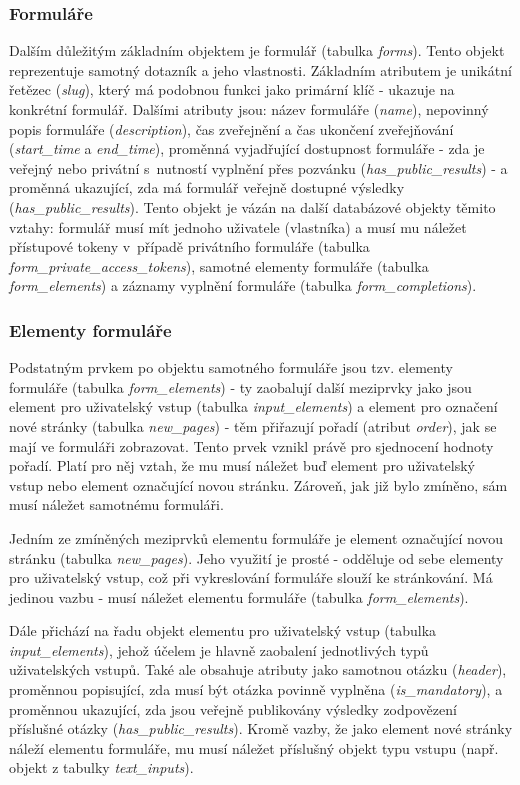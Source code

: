 	\subsubsection{Formuláře}
	Dalším důležitým základním objektem je formulář (tabulka \textit{forms}). Tento objekt reprezentuje samotný dotazník a jeho vlastnosti. Základním atributem je unikátní řetězec (\textit{slug}), který má podobnou funkci jako primární klíč - ukazuje na konkrétní formulář. Dalšími atributy jsou: název formuláře (\textit{name}), nepovinný popis formuláře (\textit{description}), čas zveřejnění a čas ukončení zveřejňování (\textit{start\_time} a \textit{end\_time}), proměnná vyjadřující dostupnost formuláře - zda je veřejný nebo privátní s~nutností vyplnění přes pozvánku (\textit{has\_public\_results}) - a proměnná ukazující, zda má formulář veřejně dostupné výsledky (\textit{has\_public\_results}). Tento objekt je vázán na další databázové objekty těmito vztahy: formulář musí mít jednoho uživatele (vlastníka) a musí mu náležet přístupové tokeny v~případě privátního formuláře (tabulka \textit{form\_private\_access\_tokens}), samotné elementy formuláře (tabulka \textit{form\_elements}) a záznamy vyplnění formuláře (tabulka \textit{form\_completions}).
	
	\subsubsection{Elementy formuláře}
	Podstatným prvkem po objektu samotného formuláře jsou tzv. elementy formuláře (tabulka \textit{form\_elements}) - ty zaobalují další meziprvky jako jsou element pro uživatelský vstup (tabulka \textit{input\_elements}) a element pro označení nové stránky (tabulka \textit{new\_pages}) - těm přiřazují pořadí (atribut \textit{order}), jak se mají ve formuláři zobrazovat. Tento prvek vznikl právě pro sjednocení hodnoty pořadí. Platí pro něj vztah, že mu musí náležet buď element pro uživatelský vstup nebo element označující novou stránku. Zároveň, jak již bylo zmíněno, sám musí náležet samotnému formuláři.
	
	Jedním ze zmíněných meziprvků elementu formuláře je element označující novou stránku (tabulka \textit{new\_pages}). Jeho využití je prosté - odděluje od sebe elementy pro uživatelský vstup, což při vykreslování formuláře slouží ke stránkování. Má jedinou vazbu - musí náležet elementu formuláře (tabulka \textit{form\_elements}).
	
	Dále přichází na řadu objekt elementu pro uživatelský vstup (tabulka \textit{input\_elements}), jehož účelem je hlavně zaobalení jednotlivých typů uživatelských vstupů. Také ale obsahuje atributy jako samotnou otázku (\textit{header}), proměnnou popisující, zda musí být otázka povinně vyplněna (\textit{is\_mandatory}), a proměnnou ukazující, zda jsou veřejně publikovány výsledky zodpovězení příslušné otázky (\textit{has\_public\_results}). Kromě vazby, že jako element nové stránky náleží elementu formuláře, mu musí náležet příslušný objekt typu vstupu (např. objekt z tabulky \textit{text\_inputs}).
	
